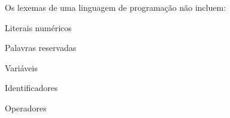 \question[10]

Os lexemas de uma linguagem de programação não incluem:

\begin{choices}
\item Literais numéricos
\item Palavras reservadas
\item Variáveis %
\item Identificadores
\item Operadores
\end{choices}
\answerline

